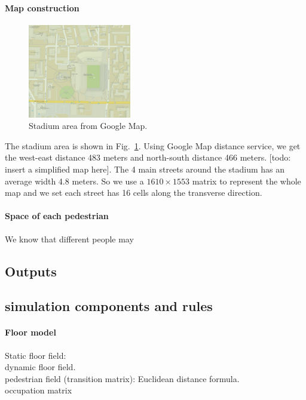 \documentclass[paper=a4, fontsize=11pt]{article} %
\begin{document}
\paragraph{Map construction}

\begin{figure}[h]
  \centering
  \includegraphics[width=0.4\textwidth]{map}
  \caption{Stadium area from Google Map.}
  \label{fig:map}
\end{figure}

The stadium area is shown in Fig.~\ref{fig:map}. Using Google Map distance
service, we get the west-east distance 483 meters and north-south distance
466 meters. [todo: insert a simplified map here]. The 4 main 
streets around the stadium has an average width 4.8 meters. So we use a 
$1610\times 1553$ matrix to represent the whole map and we set each street
has 16 cells along the transverse direction.


\paragraph{Space of each pedestrian} We know that different people may

\subsection{Outputs}

\subsection{simulation components and rules}

\paragraph{Floor model}
Static floor field: \\
dynamic floor field.\\
pedestrian field (transition matrix): Euclidean distance formula. \\
occupation matrix \\
\end{document}
